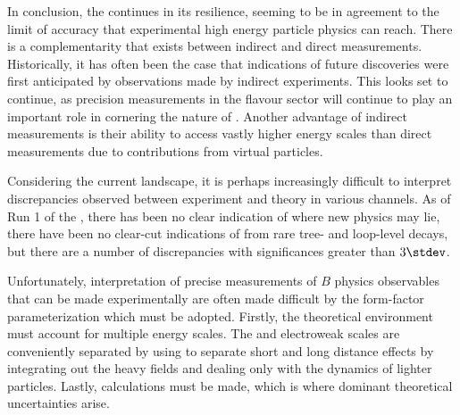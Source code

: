 In conclusion, the \sm continues in its resilience, seeming to be in agreement to the limit of
accuracy that experimental high energy particle physics can reach.
There is a complementarity that exists between indirect and direct measurements.
Historically, it has often been the case that indications of future discoveries were first
anticipated by observations made by indirect experiments.
This looks set to continue,
as precision measurements in the flavour sector will continue to play an important role in
cornering the nature of \np.
Another advantage of indirect measurements is their ability to access vastly higher energy scales
than direct measurements due to contributions from virtual particles.

Considering the current landscape, it is perhaps increasingly difficult to interpret
discrepancies observed between experiment and theory in various channels.
As of Run 1 of the \lhc, there has been no clear indication of where new physics may lie, there
have been no clear-cut indications of \np from rare tree- and loop-level decays, but there are a
number of discrepancies with significances greater than $3\stdev$.


Unfortunately, interpretation of precise measurements of $B$ physics observables that can be made
experimentally are often made difficult by the form-factor parameterization which must be adopted.
Firstly, the theoretical environment must account for multiple energy scales.
The \np and electroweak scales are conveniently separated by
using \EFT to separate short and long distance effects by integrating
out the heavy fields and dealing only with the dynamics of lighter particles.
Lastly, \QCD calculations must be made, which is where dominant theoretical uncertainties arise.


